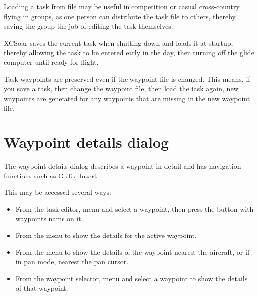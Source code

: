 \documentclass[a4paper,12pt]{refrep}
\begin{document}
\tip Loading a task from file may be useful in competition or casual
cross-country flying in groups, as one person can distribute the task
file to others, thereby saving the group the job of editing the task
themselves.


XCSoar saves the current task when shutting down and loads it at
startup, thereby allowing the task to be entered early in the day,
then turning off the glide computer until ready for flight.

Task waypoints are preserved even if the waypoint
file is changed.  This means, if you save a task, then change the
waypoint file, then load the task again, new waypoints are generated
for any waypoints that are missing in the new waypoint file.

\section{Waypoint details dialog}

The waypoint details dialog describes a waypoint in detail and has
navigation functions such as GoTo, Insert.

This may be accessed several ways:
\begin{itemize}
\item
From the task editor, menu \blink{}\blink{}
and select a waypoint, then press the button with waypoints name on it.

\item 
From the menu \blink{} to show the
details for the active waypoint.

\item
From the menu \blink{} to show the
details of the waypoint nearest the aircraft, or if in pan mode,
nearest the pan cursor.

\item
From the waypoint selector, menu \blink{} and select a waypoint to show the details of that waypoint.
\end{itemize}
\end{document}
